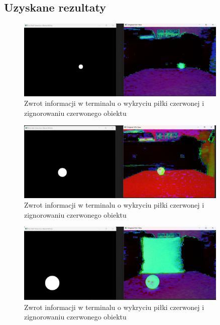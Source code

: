 \documentclass[a4paper,twoside,12pt]{book}
\begin{document}
\subsection{Uzyskane rezultaty}
\begin{figure}[h]
    \centering
    \includegraphics[width=0.9\textwidth]{Images/Porownanie/Binaryzacja/Zrzut ekranu 2025-01-02 193719.png}
    \caption{Zwrot informacji w terminalu o wykryciu piłki czerwonej i zignorowaniu czerwonego obiektu}
    \label{fig:Wykrycie piłki5}
\end{figure}
\begin{figure}[h]
    \centering
    \includegraphics[width=0.9\textwidth]{Images/Porownanie/Binaryzacja/Zrzut ekranu 2025-01-02 193549.png}
    \caption{Zwrot informacji w terminalu o wykryciu piłki czerwonej i zignorowaniu czerwonego obiektu}
    \label{fig:Wykrycie piłki5}
\end{figure}

\begin{figure}[h]
    \centering
    \includegraphics[width=0.9\textwidth]{Images/Porownanie/Binaryzacja/Zrzut ekranu 2025-01-02 193840.png}
    \caption{Zwrot informacji w terminalu o wykryciu piłki czerwonej i zignorowaniu czerwonego obiektu}
    \label{fig:Wykrycie piłki5}
\end{figure}
\end{document}
